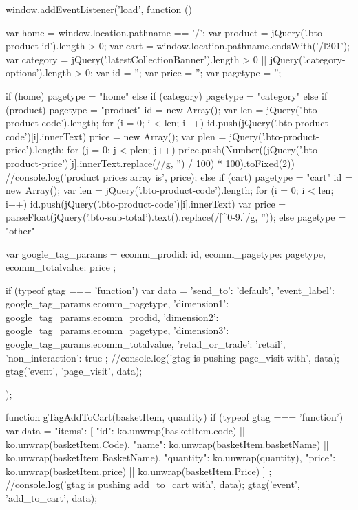     window.addEventListener('load', function () {
        var home = window.location.pathname == '/';
        var product = jQuery('.bto-product-id').length > 0;
        var cart = window.location.pathname.endsWith('/l201');
        var category = jQuery('.latestCollectionBanner').length > 0 || jQuery('.category-options').length > 0;
        var id = '';
        var price = '';
        var pagetype = '';

        if (home) {
            pagetype = "home"
        } else if (category) {
            pagetype = "category"
        } else if (product) {
            pagetype = "product"
            id = new Array();
            var len = jQuery('.bto-product-code').length;
            for (i = 0; i < len; i++) {
                id.push(jQuery('.bto-product-code')[i].innerText)
            }
            price = new Array();
            var plen = jQuery('.bto-product-price').length;
            for (j = 0; j < plen; j++) {
                price.push(Number((jQuery('.bto-product-price')[j].innerText.replace(/\s*[^\s\-0-9.]/g, '') / 100) * 100).toFixed(2))
            }
            //console.log('product prices array is', price);
        } else if (cart) {
            pagetype = "cart"
            id = new Array();
            var len = jQuery('.bto-product-code').length;
            for (i = 0; i < len; i++)
                id.push(jQuery('.bto-product-code')[i].innerText)
            var price = parseFloat(jQuery('.bto-sub-total').text().replace(/[^0-9.]/g, ''));
        } else {
            pagetype = "other"
        }

        var google_tag_params = {
            ecomm_prodid: id,
            ecomm_pagetype: pagetype,
            ecomm_totalvalue: price
        };

        if (typeof gtag === 'function') {
            var data = {
                'send_to': 'default',
                'event_label': google_tag_params.ecomm_pagetype,
                'dimension1': google_tag_params.ecomm_prodid,
                'dimension2': google_tag_params.ecomm_pagetype,
                'dimension3': google_tag_params.ecomm_totalvalue,
                'retail_or_trade': 'retail',
                'non_interaction': true
            };
            //console.log('gtag is pushing page_visit with', data);
            gtag('event', 'page_visit', data);
        }
    });

    function gTagAddToCart(basketItem, quantity) {
        if (typeof gtag === 'function') {
            var data = {
                "items": [{
                    "id": ko.unwrap(basketItem.code) || ko.unwrap(basketItem.Code),
                    "name": ko.unwrap(basketItem.basketName) || ko.unwrap(basketItem.BasketName),
                    "quantity": ko.unwrap(quantity),
                    "price": ko.unwrap(basketItem.price) || ko.unwrap(basketItem.Price)
                }]
            };
            //console.log('gtag is pushing add_to_cart with', data);
            gtag('event', 'add_to_cart', data);
        }
    }

